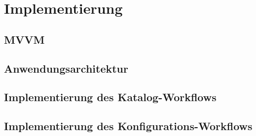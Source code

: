 \chapter{Implementierung}\label{chapter_5}

\section{MVVM}
\section{Anwendungsarchitektur}
\section{Implementierung des Katalog-Workflows}
\section{Implementierung des Konfigurations-Workflows}
